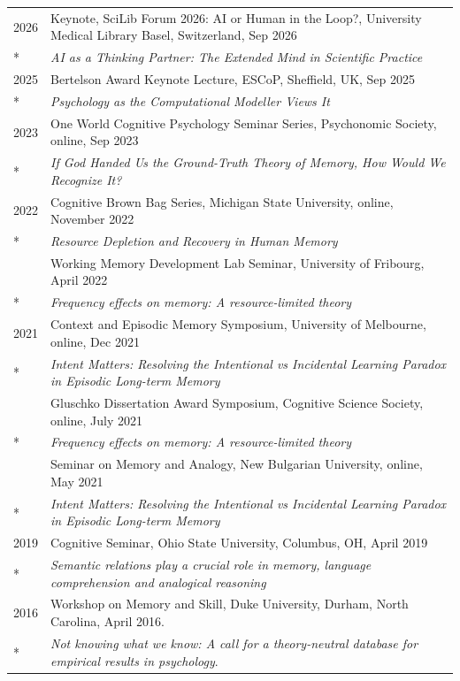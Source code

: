\documentclass[letterpaper]{article}
\begin{document}
\begin{longtable}{p{0.7cm}p{15cm}}
  2026 & Keynote, SciLib Forum 2026: AI or Human in the Loop?, University Medical Library Basel, Switzerland, Sep 2026 \\*
  & {\it AI as a Thinking Partner: The Extended Mind in Scientific Practice} \\[6pt]
  2025 & Bertelson Award Keynote Lecture, ESCoP, Sheffield, UK, Sep 2025 \\*
  & {\it Psychology as the Computational Modeller Views It} \\[6pt]
  2023 & One World Cognitive Psychology Seminar Series, Psychonomic Society, online, Sep 2023 \\*
  & {\it If God Handed Us the Ground-Truth Theory of Memory, How Would We Recognize It?} \\[6pt]
  2022 & Cognitive Brown Bag Series, Michigan State University, online, November 2022         \\* & {\it Resource Depletion and Recovery in Human Memory}\\[6pt]
  & Working Memory Development Lab Seminar, University of Fribourg, April 2022           \\* & {\it Frequency effects on memory: A resource-limited theory}\\[6pt]
  2021 & Context and Episodic Memory Symposium, University of Melbourne, online, Dec 2021     \\* & {\it Intent Matters: Resolving the Intentional vs Incidental Learning Paradox in Episodic Long-term Memory}\\[6pt]
  & Gluschko Dissertation Award Symposium, Cognitive Science Society, online, July 2021  \\* & {\it Frequency effects on memory: A resource-limited theory}\\[6pt]
  & Seminar on Memory and Analogy, New Bulgarian University, online, May 2021            \\* & {\it Intent Matters: Resolving the Intentional vs Incidental Learning Paradox in Episodic Long-term Memory}\\[6pt]
  2019 & Cognitive Seminar, Ohio State University, Columbus, OH, April 2019                   \\* & {\it Semantic relations play a crucial role in memory, language comprehension and analogical reasoning}\\[6pt]
  2016 & Workshop on Memory and Skill, Duke University, Durham, North Carolina, April 2016.   \\* & {\it Not knowing what we know: A call for a theory-neutral database for empirical results in psychology}.\\
\end{longtable}
\end{document}
